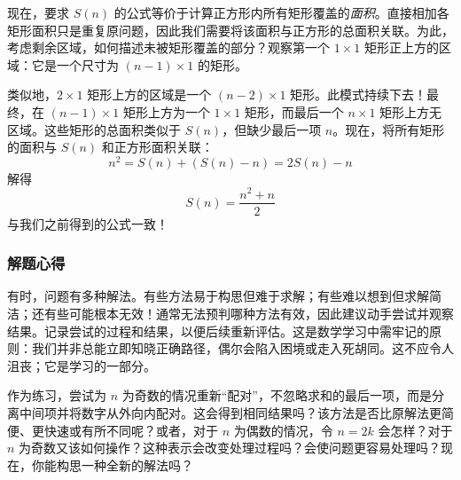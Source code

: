 现在，要求 $S(n)$ 的公式等价于计算正方形内所有矩形覆盖的\emph{面积}。直接相加各矩形面积只是重复原问题，因此我们需要将该面积与正方形的总面积关联。为此，考虑剩余区域，如何描述未被矩形覆盖的部分？观察第一个 $1 \times 1$ 矩形正上方的区域：它是一个尺寸为 $(n - 1) \times 1$ 的矩形。

类似地，$2 \times 1$ 矩形上方的区域是一个 $(n-2) \times 1$ 矩形。此模式持续下去！最终，在 $(n - 1) \times 1$ 矩形上方为一个 $1 \times 1$ 矩形，而最后一个 $n \times 1$ 矩形上方无区域。这些矩形的总面积类似于 $S(n)$，但缺少最后一项 $n$。现在，将所有矩形的面积与 $S(n)$ 和正方形面积关联：
\[n^2 = S(n) + (S(n) - n) = 2S(n) - n\]
解得
\[S(n) = \frac{n^2+n}{2}\]
与我们之前得到的公式一致！

\subsubsection*{解题心得}

有时，问题有多种解法。有些方法易于构思但难于求解；有些难以想到但求解简洁；还有些可能根本无效！通常无法预判哪种方法有效，因此建议动手尝试并观察结果。记录尝试的过程和结果，以便后续重新评估。这是数学学习中需牢记的原则：我们并非总能立即知晓正确路径，偶尔会陷入困境或走入死胡同。这不应令人沮丧；它是学习的一部分。

作为练习，尝试为 $n$ 为奇数的情况重新``配对''，不忽略求和的最后一项，而是分离中间项并将数字从外向内配对。这会得到相同结果吗？该方法是否比原解法更简便、更快速或有所不同呢？或者，对于 $n$ 为偶数的情况，令 $n=2k$ 会怎样？对于 $n$ 为奇数又该如何操作？这种表示会改变处理过程吗？会使问题更容易处理吗？现在，你能构思一种全新的解法吗？
